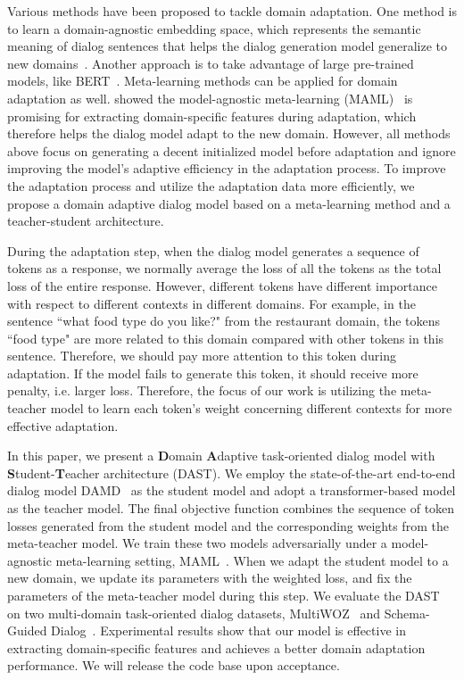 \documentclass[letterpaper]{article} %
\begin{document}
Various methods have been proposed to tackle domain adaptation.
One method is to learn a domain-agnostic embedding space, which represents the semantic meaning of dialog sentences that helps the dialog generation model generalize to new domains~\citep{zhao2018zero}.
Another approach is to take advantage of large pre-trained models, like BERT~\citep{Devlin2019BERTPO}.
Meta-learning methods can be applied for domain adaptation as well.  \citet{qian2019domain} showed the model-agnostic meta-learning  (MAML)~\citep{finn2017model} is promising for extracting domain-specific features during adaptation, which therefore helps the dialog model adapt to the new domain.
However, all methods above focus on generating a decent initialized model before adaptation and ignore improving the model's adaptive efficiency in the adaptation process.
To improve the adaptation process and utilize the adaptation data more efficiently, we propose a domain adaptive dialog model based on a meta-learning method and a teacher-student architecture.

During the adaptation step, when the dialog model generates a sequence of tokens as a response, we normally average the loss of all the tokens as the total loss of the entire response.
However, different tokens have different importance with respect to different contexts in different domains.
For example, in the sentence ``what food type do you like?" from the restaurant domain, the tokens ``food type" are more related to this domain compared with other tokens in this sentence.
Therefore, we should pay more attention to this token during adaptation.  If the model fails to generate this token, it should receive more penalty, i.e. larger loss.
Therefore, the focus of our work is utilizing the meta-teacher model to learn each token's weight concerning different contexts for more effective adaptation.



In this paper, we present a \textbf{D}omain \textbf{A}daptive task-oriented dialog model  with \textbf{S}tudent-\textbf{T}eacher architecture (DAST).
We employ the state-of-the-art end-to-end dialog model DAMD~\citep{zhang2019task} as the student model and adopt a transformer-based model as the teacher model.
The final objective function combines the sequence of token losses generated from the student model and the corresponding weights from the meta-teacher model.
We train these two models adversarially under a model-agnostic meta-learning setting, MAML~\citep{finn2017model}.
When we adapt the student model to a new domain, we update its parameters with the weighted loss, and fix the parameters of the meta-teacher model during this step.
We evaluate the DAST on two multi-domain task-oriented dialog datasets,  MultiWOZ~\citep{budzianowski2018multiwoz} and  Schema-Guided Dialog~\citep{rastogi2019towards}.
Experimental results show that our model is effective in extracting domain-specific features and achieves a better domain adaptation performance.
We will release the code base upon acceptance.
\end{document}
